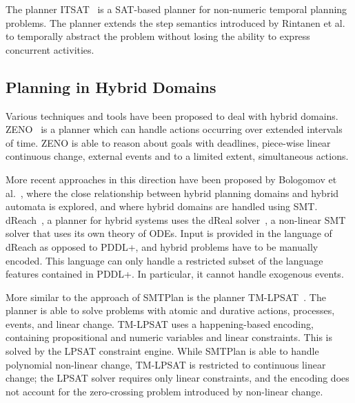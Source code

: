 The planner {\sc ITSAT}~\cite{ran15} is a SAT-based planner for non-numeric temporal planning problems. The planner extends the step semantics introduced by Rintanen et al.~\cite{rin06} to temporally abstract the problem without losing the ability to express concurrent activities.

\subsection{Planning in Hybrid Domains}\label{sec:rel_hyb}

Various techniques and tools have been proposed to deal with hybrid domains. {\sc ZENO}~\cite{zeno} is a planner which can handle actions occurring over extended intervals of time. {\sc ZENO} is able to reason about goals with deadlines, piece-wise linear continuous change, external events and to a limited extent, simultaneous actions.

More recent approaches in this direction have been proposed by Bologomov et al.~\cite{bogomolov14}, where the close relationship between hybrid planning domains and hybrid automata is explored, and \cite{bryce} where hybrid domains are handled using SMT.
%
{\sc dReach}~\cite{bryce}, a planner for hybrid systems uses the dReal solver~\cite{gao12}, a non-linear SMT solver that uses its own theory of ODEs. Input is provided in the language of {\sc dReach} as opposed to PDDL+, and hybrid problems have to be manually encoded. This language can only handle a restricted subset of the language features contained in PDDL+. In particular, it cannot handle exogenous events. 

More similar to the approach of SMTPlan is the planner {\sc TM-LPSAT}~\cite{TM-LPSAT}. The planner is able to solve problems with atomic and durative actions, processes, events, and linear change. {\sc TM-LPSAT} uses a happening-based encoding, containing propositional and numeric variables and linear constraints. This is solved by the LPSAT constraint engine. While SMTPlan is able to handle polynomial non-linear change, {\sc TM-LPSAT} is restricted to continuous linear change; the LPSAT solver requires only linear constraints, and the encoding does not account for the zero-crossing problem introduced by non-linear change.


